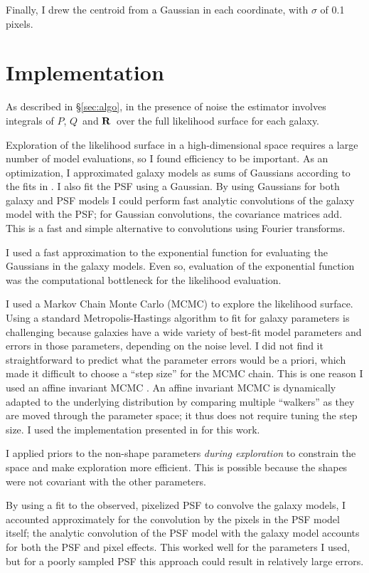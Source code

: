 \documentclass[usegraphicx,usenatbib]{mn2e}
\newcommand{\vecQ}{\mbox{\boldmath $Q$}}
\newcommand{\matR}{\mbox{$\bf R$}}
\begin{document}
Finally, I drew the centroid from a Gaussian in each coordinate, with $\sigma$
of 0.1 pixels.  


\section{Implementation} \label{sec:impl}

As described in \S \ref{sec:algo}, in the presence of noise the estimator
involves integrals of $P$, \vecQ\ and \matR\ over the full likelihood surface
for each galaxy.

Exploration of the likelihood surface in a high-dimensional space requires a
large number of model evaluations, so I found efficiency to be important.  As
an optimization, I approximated galaxy models as sums of Gaussians according to
the fits in \citet{HoggGMix}.  I also fit the PSF using a Gaussian.  By using
Gaussians for both galaxy and PSF models I could perform fast analytic
convolutions of the galaxy model with the PSF; for Gaussian convolutions, the
covariance matrices add.  This is a fast and simple alternative to convolutions
using Fourier transforms.

I used a fast approximation to the exponential function for evaluating the
Gaussians in the galaxy models.  Even so, evaluation of the exponential
function was the computational bottleneck for the likelihood evaluation.

I used a Markov Chain Monte Carlo (MCMC) to explore the likelihood surface.
Using a standard Metropolis-Hastings algorithm \citep{Metropolis53}  to fit for
galaxy parameters is challenging because galaxies have a wide variety of
best-fit model parameters and errors in those parameters, depending on the
noise level.  I did not find it straightforward to predict what the parameter
errors would be a priori, which made it difficult to choose a ``step size'' for
the MCMC chain.  This is one reason I used an affine invariant MCMC
\citep{GoodmanWeare10}.  An affine invariant MCMC is dynamically adapted to the
underlying distribution by comparing multiple ``walkers'' as they are moved
through the parameter space; it thus does not require tuning the step size.  I
used the implementation presented in \citet{Mackey13} for this work.

I applied priors to the non-shape parameters {\it during exploration} to
constrain the space and make exploration more efficient.  This is possible
because the shapes were not covariant with the other parameters.

By using a fit to the observed, pixelized PSF to convolve the galaxy models, I
accounted approximately for the convolution by the pixels in the PSF model
itself;  the analytic convolution of the PSF model with the galaxy model
accounts for both the PSF and pixel effects.  This worked well for the
parameters I used, but for a poorly sampled PSF this approach could result in
relatively large errors.
\end{document}

